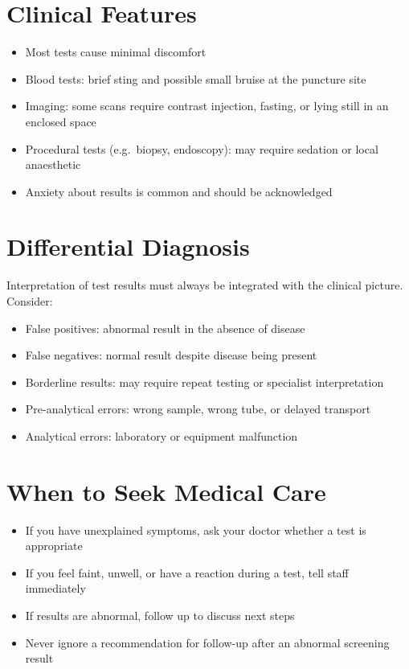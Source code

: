 \section*{Clinical Features}
\begin{itemize}
    \item Most tests cause minimal discomfort
    \item Blood tests: brief sting and possible small bruise at the puncture site
    \item Imaging: some scans require contrast injection, fasting, or lying still in an enclosed space
    \item Procedural tests (e.g.\ biopsy, endoscopy): may require sedation or local anaesthetic
    \item Anxiety about results is common and should be acknowledged
\end{itemize}

\section*{Differential Diagnosis}
Interpretation of test results must always be integrated with the clinical picture. Consider:
\begin{itemize}
    \item False positives: abnormal result in the absence of disease
    \item False negatives: normal result despite disease being present
    \item Borderline results: may require repeat testing or specialist interpretation
    \item Pre-analytical errors: wrong sample, wrong tube, or delayed transport
    \item Analytical errors: laboratory or equipment malfunction
\end{itemize}

\section*{When to Seek Medical Care}
\begin{itemize}
    \item If you have unexplained symptoms, ask your doctor whether a test is appropriate
    \item If you feel faint, unwell, or have a reaction during a test, tell staff immediately
    \item If results are abnormal, follow up to discuss next steps
    \item Never ignore a recommendation for follow-up after an abnormal screening result
\end{itemize}

